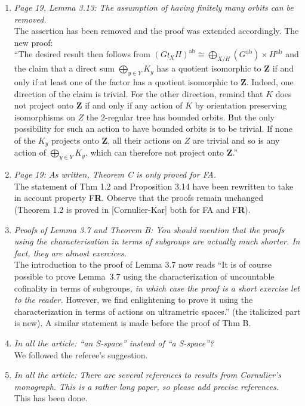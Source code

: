 \documentclass[english,a4paper]{article}
\DeclareMathOperator\ab{ab}
\newcommand*{\FA}{FA}
\newcommand*{\FR}{F\textbf{R}}
\newcommand*\Z{\mathbf{Z}}
\begin{document}
\begin{enumerate}
%
\item\textit{Page 19, Lemma 3.13: The assumption of having finitely many orbits can be removed.}\\
The assertion has been removed and the proof was extended accordingly. The new proof:\\
``The desired result then follows from $(G\wr_XH)^{\ab}\cong \bigoplus_{X/H}(G^{\ab})\times H^{\ab}$ and the claim that a direct sum $\bigoplus_{y\in Y}K_y$ has a quotient isomorphic to $\Z$ if and only if at least one of the factor has a quotient isomorphic to $\Z$.
Indeed, one direction of the claim is trivial.
For the other direction, remind that $K$ does not project onto $\Z$ if and only if any action of $K$ by orientation preserving isomorphisms on $Z$ the $2$-regular tree has bounded orbits. But the only possibility for such an action to have bounded orbits is to be trivial.
If none of the $K_y$ projects onto $\Z$, all their actions on $Z$ are trivial and so is any action of $\bigoplus_{y\in Y}K_y$, which can therefore not project onto $\Z$.''
%
\item\textit{Page 19: As written, Theorem C is only proved for \FA.}\\
The statement of Thm 1.2 and Proposition 3.14 have been rewritten to take in account property \FR. Observe that the proofs remain unchanged (Theorem 1.2 is proved in [Cornulier-Kar] both for \FA{} and \FR).
%
\item\textit{Proofs of Lemma 3.7 and Theorem B: You should mention that the proofs using the characterisation in terms of subgroups are actually much shorter. In fact, they are almost exercices.}\\
The introduction to the proof of Lemma 3.7 now reads ``It is of course possible to prove Lemma~3.7 using the characterization of uncountable cofinality in terms of subgroups\emph{, in which case the proof is a short exercise let to the reader.} However, we find enlightening to prove it using the characterization in terms of actions on ultrametric spaces.'' (the italicized part is new).
A similar statement is made before the proof of Thm B.
%
\item\textit{In all the article: “an S-space” instead of “a S-space”?}\\
We followed the referee's suggestion.
%
\item\textit{In all the article: There are several references to results from Cornulier’s monograph. This is a rather long paper, so please add precise references.}\\
This has been done.








\end{enumerate}
\end{document}
